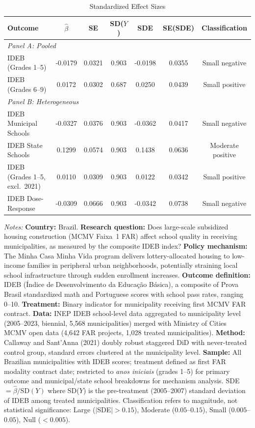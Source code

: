 \begin{table}[t]
\centering
\caption{Standardized Effect Sizes}
\label{tab:sde}
\begin{threeparttable}
\footnotesize
\begin{tabular}{@{}lcccccc@{}}
\toprule
Outcome & $\hat{\beta}$ & SE & SD($Y$) & SDE & SE(SDE) & Classification \\
\midrule
\multicolumn{7}{l}{\textit{Panel A: Pooled}} \\[3pt]
IDEB (Grades 1--5) & -0.0179 & 0.0321 & 0.903 & -0.0198 & 0.0355 & Small negative \\
IDEB (Grades 6--9) & 0.0172 & 0.0302 & 0.687 & 0.0250 & 0.0439 & Small positive \\
\midrule
\multicolumn{7}{l}{\textit{Panel B: Heterogeneous}} \\[3pt]
IDEB Municipal Schools & -0.0327 & 0.0376 & 0.903 & -0.0362 & 0.0417 & Small negative \\
IDEB State Schools & 0.1299 & 0.0574 & 0.903 & 0.1438 & 0.0636 & Moderate positive \\
IDEB (Grades 1--5, excl.\ 2021) & 0.0110 & 0.0309 & 0.903 & 0.0122 & 0.0342 & Small positive \\
IDEB Dose-Response & -0.0309 & 0.0666 & 0.903 & -0.0342 & 0.0738 & Small negative \\
\bottomrule
\end{tabular}
\begin{tablenotes}
\item \textit{Notes:} \textbf{Country:} Brazil. \textbf{Research question:} Does large-scale subsidized housing construction (MCMV Faixa~1 FAR) affect school quality in receiving municipalities, as measured by the composite IDEB index? \textbf{Policy mechanism:} The Minha Casa Minha Vida program delivers lottery-allocated housing to low-income families in peripheral urban neighborhoods, potentially straining local school infrastructure through sudden enrollment increases. \textbf{Outcome definition:} IDEB (\'{I}ndice de Desenvolvimento da Educa\c{c}\~{a}o B\'{a}sica), a composite of Prova Brasil standardized math and Portuguese scores with school pass rates, ranging 0--10. \textbf{Treatment:} Binary indicator for municipality receiving first MCMV FAR contract. \textbf{Data:} INEP IDEB school-level data aggregated to municipality level (2005--2023, biennial, 5,568 municipalities) merged with Ministry of Cities MCMV open data (4,642 FAR projects, 1,028 treated municipalities). \textbf{Method:} Callaway and Sant'Anna (2021) doubly robust staggered DiD with never-treated control group, standard errors clustered at the municipality level. \textbf{Sample:} All Brazilian municipalities with IDEB scores; treatment defined as first FAR modality contract date; restricted to \textit{anos iniciais} (grades 1--5) for primary outcome and municipal/state school breakdowns for mechanism analysis. SDE $= \hat{\beta} / \text{SD}(Y)$ where SD($Y$) is the pre-treatment (2005--2007) standard deviation of IDEB among treated municipalities. Classification refers to magnitude, not statistical significance: Large ($|$SDE$| > 0.15$), Moderate ($0.05$--$0.15$), Small ($0.005$--$0.05$), Null ($< 0.005$).

\end{tablenotes}
\end{threeparttable}
\end{table}

